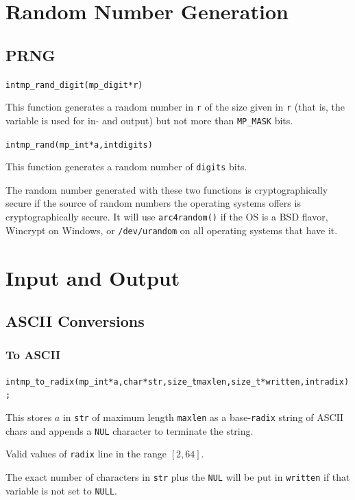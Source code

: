 \documentclass[synpaper]{book}
\begin{document}
\chapter{Random Number Generation}
\section{PRNG}
\begin{alltt}
int mp_rand_digit(mp_digit *r)
\end{alltt}
This function generates a random number in \texttt{r} of the size given in \texttt{r} (that is, the variable is used for in- and output) but not more than \texttt{MP\_MASK} bits.

\begin{alltt}
int mp_rand(mp_int *a, int digits)
\end{alltt}
This function generates a random number of \texttt{digits} bits.

The random number generated with these two functions is cryptographically secure if the source of random numbers the operating systems offers is cryptographically secure. It will use \texttt{arc4random()} if the OS is a BSD flavor, Wincrypt on Windows, or \texttt{/dev/urandom} on all operating systems that have it.

\chapter{Input and Output}
\section{ASCII Conversions}
\subsection{To ASCII}
\begin{alltt}
int mp_to_radix (mp_int *a, char *str, size_t maxlen, size_t *written, int radix);
\end{alltt}
This stores $a$ in \texttt{str} of maximum length \texttt{maxlen} as a base-\texttt{radix} string of ASCII chars and appends a \texttt{NUL} character to terminate the string.

Valid values of \texttt{radix} line in the range $[2, 64]$.

The exact number of characters in \texttt{str} plus the \texttt{NUL} will be put in \texttt{written} if that variable is not set to \texttt{NULL}.
\end{document}
